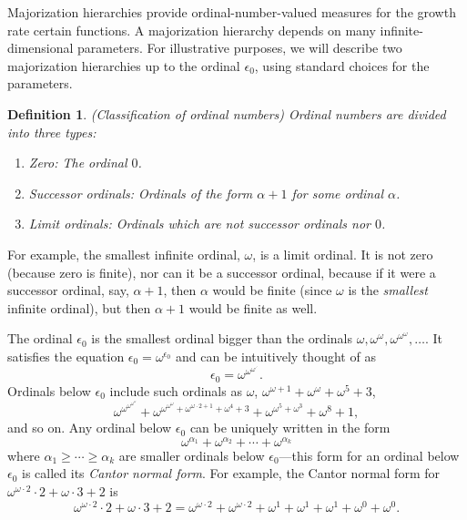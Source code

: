 \documentclass{article}
\newtheorem{definition}[theorem]{Definition}
\begin{document}
Majorization hierarchies \cite{weiermann2002slow}
provide ordinal-number-valued measures for the growth
rate certain functions. A majorization hierarchy depends
on many infinite-dimensional parameters. For illustrative purposes,
we will describe two majorization hierarchies up to the ordinal $\epsilon_0$,
using standard choices for the parameters.

\begin{definition}
    (Classification of ordinal numbers)
    Ordinal numbers are divided into three types:
    \begin{enumerate}
        \item Zero: The ordinal $0$.
        \item Successor ordinals: Ordinals of the form $\alpha+1$ for some ordinal $\alpha$.
        \item Limit ordinals: Ordinals which are not successor ordinals nor $0$.
    \end{enumerate}
\end{definition}

For example, the smallest infinite ordinal, $\omega$, is a limit ordinal. It is not zero
(because zero is finite),
nor can it be a successor ordinal, because if it were a successor ordinal, say, $\alpha+1$,
then $\alpha$ would be finite (since $\omega$ is the \emph{smallest} infinite ordinal),
but then $\alpha+1$ would be finite as well.

The ordinal $\epsilon_0$ is the smallest ordinal bigger than the ordinals
$\omega,\omega^\omega,\omega^{\omega^\omega},\ldots$. It satisfies the equation
$\epsilon_0=\omega^{\epsilon_0}$ and can be intuitively thought of as
\[
    \epsilon_0 = \omega^{\omega^{\omega^{\iddots}}}.
\]
Ordinals below $\epsilon_0$ include such ordinals as $\omega$,
$\omega^{\omega+1}+\omega^{\omega}+\omega^5+3$,
\[
\omega^{\omega^{\omega^{\omega^\omega}}}+
\omega^{\omega^{\omega^\omega}+\omega^{\omega\cdot 2+1}+\omega^4 + 3}
+ \omega^{\omega^5+\omega^3}+\omega^8+1,
\]
and so on.
Any ordinal below $\epsilon_0$ can be uniquely written in the form
\[
    \omega^{\alpha_1}+\omega^{\alpha_2}+\cdots + \omega^{\alpha_k}
\]
where $\alpha_1\geq\cdots\geq\alpha_k$ are smaller ordinals below $\epsilon_0$---this form
for an ordinal below $\epsilon_0$ is called its \emph{Cantor normal form}.
For example, the Cantor normal form for $\omega^{\omega\cdot 2}\cdot 2+\omega\cdot 3+2$
is
\[
\omega^{\omega\cdot 2}\cdot 2+\omega\cdot 3+2
=
\omega^{\omega\cdot 2} + \omega^{\omega\cdot 2} + \omega^1 + \omega^1 + \omega^1
+\omega^0 + \omega^0.
\]
\end{document}
